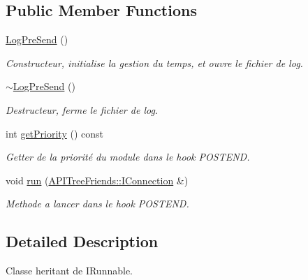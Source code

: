 \subsection*{Public Member Functions}
\begin{DoxyCompactItemize}
\item 
\hypertarget{class_log_pre_send_a3dd3d6693cb8677191570c883baa8fed}{}\hyperlink{class_log_pre_send_a3dd3d6693cb8677191570c883baa8fed}{Log\+Pre\+Send} ()\label{class_log_pre_send_a3dd3d6693cb8677191570c883baa8fed}

\begin{DoxyCompactList}\small\item\em Constructeur, initialise la gestion du temps, et ouvre le fichier de log. \end{DoxyCompactList}\item 
\hypertarget{class_log_pre_send_a7be6452e2d38a51f84f856a9a543fc7d}{}\hyperlink{class_log_pre_send_a7be6452e2d38a51f84f856a9a543fc7d}{$\sim$\+Log\+Pre\+Send} ()\label{class_log_pre_send_a7be6452e2d38a51f84f856a9a543fc7d}

\begin{DoxyCompactList}\small\item\em Destructeur, ferme le fichier de log. \end{DoxyCompactList}\item 
int \hyperlink{class_log_pre_send_a8dd83e1661602e3f2c6318e1fb6b695f}{get\+Priority} () const 
\begin{DoxyCompactList}\small\item\em Getter de la priorité du module dans le hook P\+O\+S\+T\+E\+N\+D. \end{DoxyCompactList}\item 
\hypertarget{class_log_pre_send_aef56513bfe060da02d63a86519c1e694}{}void \hyperlink{class_log_pre_send_aef56513bfe060da02d63a86519c1e694}{run} (\hyperlink{class_a_p_i_tree_friends_1_1_i_connection}{A\+P\+I\+Tree\+Friends\+::\+I\+Connection} \&)\label{class_log_pre_send_aef56513bfe060da02d63a86519c1e694}

\begin{DoxyCompactList}\small\item\em Methode a lancer dans le hook P\+O\+S\+T\+E\+N\+D. \end{DoxyCompactList}\end{DoxyCompactItemize}


\subsection{Detailed Description}
Classe heritant de I\+Runnable. 

